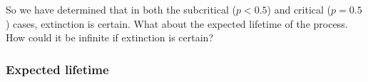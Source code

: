 \documentclass[11pt]{article}
\begin{document}
            
            
            
            

\vspace{10pt}
\noindent
So we have determined that in both the subcritical ($p < 0.5$) and critical ($p = 0.5$) cases, extinction is certain. What about the expected lifetime of the process. How could it be infinite if extinction is certain?




\subsubsection{Expected lifetime}
\end{document}
